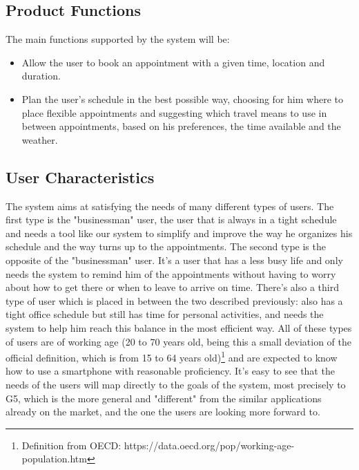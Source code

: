 \documentclass[12pt]{article}
\begin{document}
\subsection{Product Functions}
The main functions supported by the system will be:
\begin{itemize}
    \item Allow the user to book an appointment with a given time, location and duration.
    \item Plan the user's schedule in the best possible way, choosing for him where to place flexible appointments and suggesting which travel means to use in between appointments, based on his preferences, the time available and the weather.
\end{itemize}

\subsection{User Characteristics}
The system aims at satisfying the needs of many different types of users. The first type is the "businessman" user, the user that is always in a tight schedule and needs a tool like our system to simplify and improve the way he organizes his schedule and the way turns up to the appointments. The second type is the opposite of the "businessman" user. It's a user that has a less busy life and only needs the system to remind him of the appointments without having to worry about how to get there or when to leave to arrive on time. There's also a third type of user which is placed in between the two described previously: also has a tight office schedule but still has time for personal activities, and needs the system to help him reach this balance in the most efficient way.
All of these types of users are of working age (20 to 70 years old, being this a small deviation of the official definition, which is from 15 to 64 years old)\footnote{Definition from OECD: https://data.oecd.org/pop/working-age-population.htm} and are expected to know how to use a smartphone with reasonable proficiency. It's easy to see that the needs of the users will map directly to the goals of the system, most precisely to G5, which is the more general and "different" from the similar applications already on the market, and the one the users are looking more forward to.
\end{document}
